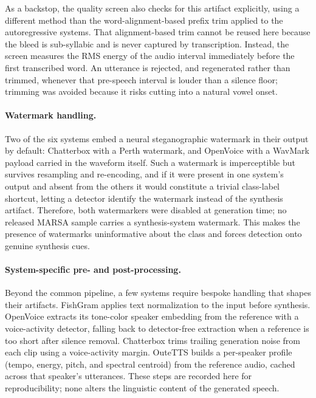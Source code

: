 \documentclass[11pt]{article}
\begin{document}
As a backstop, the quality screen also checks for this artifact
explicitly, using a different method than the word-alignment-based
prefix trim applied to the autoregressive systems. That alignment-based
trim cannot be reused here because the bleed is sub-syllabic and is
never captured by transcription. Instead, the screen measures the RMS
energy of the audio interval immediately before the first transcribed
word. An utterance is rejected, and regenerated rather than trimmed,
whenever that pre-speech interval is louder than a silence floor;
trimming was avoided because it risks cutting into a natural vowel
onset.


 
\paragraph{Watermark handling.} Two of the six systems embed a neural
steganographic watermark in their output by default: Chatterbox with a
Perth watermark, and OpenVoice with a WavMark payload carried in the
waveform itself. Such a watermark is imperceptible but survives
resampling and re-encoding, and if it were present in one system's
output and absent from the others it would constitute a trivial
class-label shortcut, letting a detector identify the watermark instead
of the synthesis artifact. Therefore, both watermarkers were disabled at
generation time; no released MARSA sample carries a synthesis-system
watermark. This makes the presence of watermarks uninformative about
the class and forces detection onto genuine synthesis cues.



\paragraph{System-specific pre- and post-processing.} Beyond the common
pipeline, a few systems require bespoke handling that shapes their
artifacts. FishGram applies text normalization to the input before
synthesis. OpenVoice extracts its tone-color speaker embedding from the
reference with a voice-activity detector, falling back to
detector-free extraction when a reference is too short after silence
removal. Chatterbox trims trailing generation noise from each clip using
a voice-activity margin. OuteTTS builds a per-speaker profile (tempo,
energy, pitch, and spectral centroid) from the reference audio, cached
across that speaker's utterances. These steps are recorded here for
reproducibility; none alters the linguistic content of the generated
speech.
\end{document}
